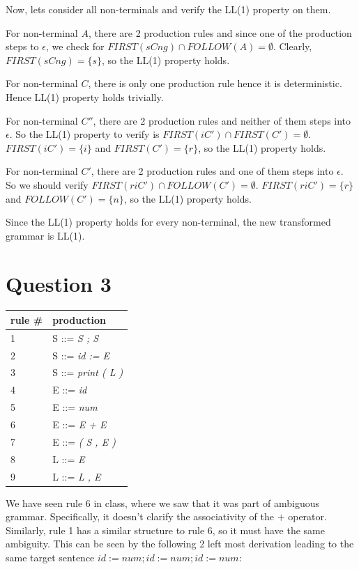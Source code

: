 \documentclass{article}
\begin{document}
    Now, lets consider all non-terminals and verify the LL(1) property on them.

    For non-terminal $A$, there are 2 production rules and since one of the production steps to $\epsilon$, we check for $FIRST(s C n g) \cap FOLLOW(A) = \emptyset$. Clearly, $FIRST(s C n g) = \{s\}$, so the LL(1) property holds.

    For non-terminal $C$, there is only one production rule hence it is deterministic. Hence LL(1) property holds trivially.

    For non-terminal $C''$, there are 2 production rules and neither of them steps into $\epsilon$. So the LL(1) property to verify is $FIRST(i C') \cap FIRST(C') = \emptyset$. $FIRST(i C') = \{i\}$ and $FIRST(C') = \{r\}$, so the LL(1) property holds.

    For non-terminal $C'$, there are 2 production rules and one of them steps into $\epsilon$. So we should verify $FIRST(r i C') \cap FOLLOW(C') = \emptyset$. $FIRST(r i C') = \{r\}$ and $FOLLOW(C') = \{n\}$, so the LL(1) property holds.

    Since the LL(1) property holds for every non-terminal, the new transformed grammar is LL(1).

    \section*{Question 3}
    \begin{center}
        \begin{tabular}{ l l }
        \hline
        rule \# & production \\
        \hline
        1   &   S   ::= \textit{S ; S} \\
        2   &   S   ::= \textit{id := E} \\
        3   &   S   ::= \textit{print ( L )} \\
        4   &   E   ::= \textit{id} \\
        5   &   E   ::= \textit{num} \\
        6   &   E   ::= \textit{E + E} \\
        7   &   E   ::= \textit{( S , E )} \\
        8   &   L   ::= \textit{E} \\
        9   &   L   ::= \textit{L , E} \\
        \end{tabular}
    \end{center}

    We have seen rule 6 in class, where we saw that it was part of ambiguous grammar. Specifically, it doesn't clarify the associativity of the $+$ operator. Similarly, rule 1 has a similar structure to rule 6, so it must have the same ambiguity. This can be seen by the following 2 left most derivation leading to the same target sentence $id := num ; id := num ; id := num$:
\end{document}

